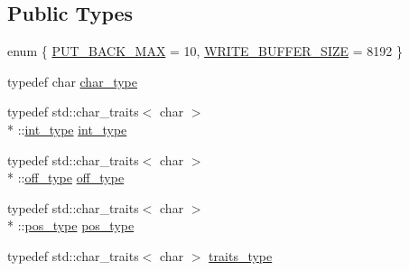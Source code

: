 \subsection*{Public Types}
\begin{DoxyCompactItemize}
\item 
enum \{ \hyperlink{classpion_1_1tcp_1_1stream__buffer_a25df9358691ed8b70684d53efb186928a5ac13e72ea6183eb2e5a2c2d085810d1}{P\-U\-T\-\_\-\-B\-A\-C\-K\-\_\-\-M\-A\-X} = 10, 
\hyperlink{classpion_1_1tcp_1_1stream__buffer_a25df9358691ed8b70684d53efb186928ae78f66502c67c6dea5194a4b86c41871}{W\-R\-I\-T\-E\-\_\-\-B\-U\-F\-F\-E\-R\-\_\-\-S\-I\-Z\-E} = 8192
 \}
\item 
typedef char \hyperlink{classpion_1_1tcp_1_1stream__buffer_a1fa60cd7dbf11eebb2983fe2a115a2e4}{char\-\_\-type}
\item 
typedef std\-::char\-\_\-traits$<$ char $>$\\*
\-::\hyperlink{classpion_1_1tcp_1_1stream__buffer_a7dcf4943671520d4018b4468c336e86e}{int\-\_\-type} \hyperlink{classpion_1_1tcp_1_1stream__buffer_a7dcf4943671520d4018b4468c336e86e}{int\-\_\-type}
\item 
typedef std\-::char\-\_\-traits$<$ char $>$\\*
\-::\hyperlink{classpion_1_1tcp_1_1stream__buffer_ac9b79dc64ad2b3e76c121b00ffc6e951}{off\-\_\-type} \hyperlink{classpion_1_1tcp_1_1stream__buffer_ac9b79dc64ad2b3e76c121b00ffc6e951}{off\-\_\-type}
\item 
typedef std\-::char\-\_\-traits$<$ char $>$\\*
\-::\hyperlink{classpion_1_1tcp_1_1stream__buffer_a3d24ccbacf44098151258b4219f3730c}{pos\-\_\-type} \hyperlink{classpion_1_1tcp_1_1stream__buffer_a3d24ccbacf44098151258b4219f3730c}{pos\-\_\-type}
\item 
typedef std\-::char\-\_\-traits$<$ char $>$ \hyperlink{classpion_1_1tcp_1_1stream__buffer_a965a21f484cb7a926f7fb80f364c8373}{traits\-\_\-type}
\end{DoxyCompactItemize}
